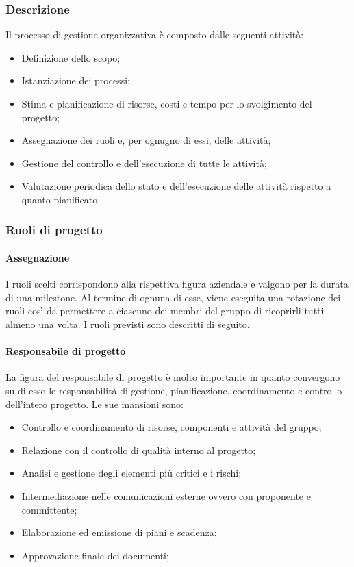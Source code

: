 		\subsubsection{Descrizione}
			Il processo di gestione organizzativa è composto dalle seguenti attività:
			\begin{itemize}
				\item Definizione dello scopo;
				\item Istanziazione dei processi;
				\item Stima e pianificazione di risorse, costi e tempo per lo svolgimento del progetto;
				\item Assegnazione dei ruoli e, per ognugno di essi, delle attività;
				\item Gestione del controllo e dell'esecuzione di tutte le attività;
				\item Valutazione periodica dello stato e dell'esecuzione delle attività rispetto a quanto pianificato.
			\end{itemize}
		\subsubsection{Ruoli di progetto}
			\paragraph*{Assegnazione}
				I ruoli scelti corrispondono alla rispettiva figura aziendale e valgono per la durata di una milestone. Al termine di ognuna di esse, viene eseguita una rotazione dei ruoli così da permettere a ciascuno dei membri del gruppo di ricoprirli tutti almeno una volta.
				I ruoli previsti sono descritti di seguito.
			\paragraph{Responsabile di progetto}
				La figura del responsabile di progetto è molto importante in quanto convergono su di esso le responsabilità di gestione, pianificazione, coordinamento e controllo dell'intero progetto.
				Le sue mansioni sono:
				\begin{itemize}
					\item Controllo e coordinamento di risorse, componenti e attività del gruppo;
					\item Relazione con il controllo di qualità interno al progetto;
					\item Analisi e gestione degli elementi più critici e i rischi;
					\item Intermediazione nelle comunicazioni esterne ovvero con proponente e committente;
					\item Elaborazione ed emissione di piani e scadenza;
					\item Approvazione finale dei documenti;
				\end{itemize}
